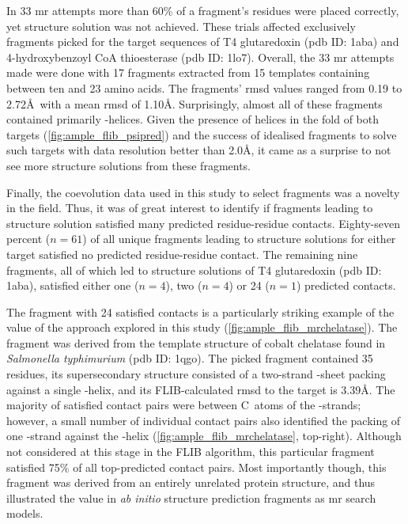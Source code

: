 In 33 \gls{mr} attempts more than 60\% of a fragment's residues were placed correctly, yet structure solution was not achieved. These trials affected exclusively fragments picked for the target sequences of T4 glutaredoxin (\gls{pdb} ID: 1aba) and 4-hydroxybenzoyl CoA thioesterase (\gls{pdb} ID: 1lo7). Overall, the 33 \gls{mr} attempts made were done with 17 fragments extracted from 15 templates containing between ten and 23 amino acids. The fragments' \gls{rmsd} values ranged from 0.19 to 2.72\AA\ with a mean \gls{rmsd} of 1.10\AA. Surprisingly, almost all of these fragments contained primarily \textalpha-helices. Given the presence of helices in the fold of both targets (\cref{fig:ample_flib_psipred}) and the success of idealised fragments to solve such targets with data resolution better than 2.0\AA, it came as a surprise to not see more structure solutions from these fragments.

Finally, the coevolution data used in this study to select fragments was a novelty in the field. Thus, it was of great interest to identify if fragments leading to structure solution satisfied many predicted residue-residue contacts. Eighty-seven percent ($n=61$) of all unique fragments leading to structure solutions for either target satisfied no predicted residue-residue contact. The remaining nine fragments, all of which led to structure solutions of T4 glutaredoxin (\gls{pdb} ID: 1aba), satisfied either one ($n=4$), two ($n=4$) or 24 ($n=1$) predicted contacts. 

The fragment with 24 satisfied contacts is a particularly striking example of the value of the approach explored in this study (\cref{fig:ample_flib_mrchelatase}). The fragment was derived from the template structure of cobalt chelatase found in \textit{Salmonella typhimurium} (\gls{pdb} ID: 1qgo). The picked fragment contained 35 residues, its supersecondary structure consisted of a two-strand \textbeta-sheet packing against a single \textalpha-helix, and its FLIB-calculated \gls{rmsd} to the target is 3.39\AA. The majority of satisfied contact pairs were between C\textbeta\ atoms of the \textbeta-strands; however, a small number of individual contact pairs also identified the packing of one \textbeta-strand against the \textalpha-helix (\cref{fig:ample_flib_mrchelatase}, top-right). Although not considered at this stage in the FLIB algorithm, this particular fragment satisfied 75\% of all top-predicted contact pairs. Most importantly though, this fragment was derived from an entirely unrelated protein structure, and thus illustrated the value in \textit{ab initio} structure prediction fragments as \gls{mr} search models.

